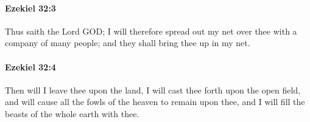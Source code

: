 		\paragraph{Ezekiel 32:3} %
			\label{EZEKIEL-32-3}

			Thus saith the Lord GOD; I will therefore spread out my net over thee with a company of many people; and they shall bring thee up in my net.


		\paragraph{Ezekiel 32:4} %
			\label{EZEKIEL-32-4}

			Then will I leave thee upon the land, I will cast thee forth upon the open field, and will cause all the fowls of the heaven to remain upon thee, and I will fill the beasts of the whole earth with thee.


